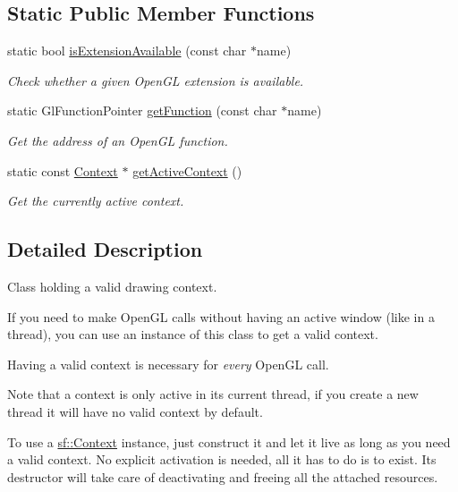 \subsection*{Static Public Member Functions}
\begin{DoxyCompactItemize}
\item 
static bool \hyperlink{classsf_1_1_context_a163c7f72c0c20133606657d895faa147}{is\+Extension\+Available} (const char $\ast$name)
\begin{DoxyCompactList}\small\item\em Check whether a given Open\+GL extension is available. \end{DoxyCompactList}\item 
static Gl\+Function\+Pointer \hyperlink{classsf_1_1_context_a998980d311effdf6223ce40d934c23c3}{get\+Function} (const char $\ast$name)
\begin{DoxyCompactList}\small\item\em Get the address of an Open\+GL function. \end{DoxyCompactList}\item 
static const \hyperlink{classsf_1_1_context}{Context} $\ast$ \hyperlink{classsf_1_1_context_a26ec3ddaf11a37c0630624037c4eea2d}{get\+Active\+Context} ()
\begin{DoxyCompactList}\small\item\em Get the currently active context. \end{DoxyCompactList}\end{DoxyCompactItemize}


\subsection{Detailed Description}
Class holding a valid drawing context. 

If you need to make Open\+GL calls without having an active window (like in a thread), you can use an instance of this class to get a valid context.

Having a valid context is necessary for {\itshape every} Open\+GL call.

Note that a context is only active in its current thread, if you create a new thread it will have no valid context by default.

To use a \hyperlink{classsf_1_1_context}{sf\+::\+Context} instance, just construct it and let it live as long as you need a valid context. No explicit activation is needed, all it has to do is to exist. Its destructor will take care of deactivating and freeing all the attached resources.

